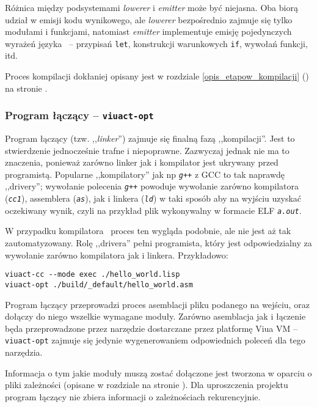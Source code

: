Różnica między podsystemami \emph{lowerer} i \emph{emitter} może być niejasna. Oba biorą udział w emisji
kodu wynikowego, ale \emph{lowerer} bezpośrednio zajmuje się tylko modułami i funkcjami, natomiast
\emph{emitter} implementuje emisję pojedynczych wyrażeń języka \ViuAct\ -- przypisań \texttt{let}, konstrukcji
warunkowych \texttt{if}, wywołań funkcji, itd.

Proces kompilacji dokłaniej opisany jest w rozdziale \ref{opis_etapow_kompilacji}
() na stronie \pageref{opis_etapow_kompilacji}.

\subsubsection{Program łączący -- \texttt{viuact-opt}}
\label{opis_linkera}

Program łączący (tzw. ,,\emph{linker}'') zajmuje się finalną fazą ,,kompilacji''.
Jest to stwierdzenie jednocześnie trafne i niepoprawne. Zazwyczaj jednak nie ma to znaczenia, ponieważ zarówno
linker jak i kompilator jest ukrywany przed programistą. Popularne ,,kompilatory'' jak np \emph{\texttt{g++}}
z GCC to tak naprawdę ,,drivery''; wywołanie polecenia \emph{\texttt{g++}} powoduje wywołanie zarówno
kompilatora (\emph{\texttt{cc1}}), assemblera (\emph{\texttt{as}}), jak i linkera (\emph{\texttt{ld}}) w taki
sposób aby na wyjściu uzyskać oczekiwany wynik, czyli na przykład plik wykonywalny w formacie
ELF \emph{\texttt{a.out}}.

W przypadku kompilatora \ViuAct\ proces ten wygląda podobnie, ale nie jest aż tak zautomatyzowany.
Rolę ,,drivera'' pełni programista, który jest odpowiedzialny za wywołanie zarówno kompilatora jak i linkera.
Przykładowo:

\begin{lstlisting}[caption={,,Hello World!'' kompilacji}]
viuact-cc --mode exec ./hello_world.lisp
viuact-opt ./build/_default/hello_world.asm
\end{lstlisting}

Program łączący przeprowadzi proces asemblacji pliku podanego na wejściu, oraz dołączy do niego wszelkie
wymagane moduły. Zarówno asemblacja jak i łączenie będa przeprowadzone przez narzędzie dostarczane przez
platformę Viua VM -- \texttt{viuact-opt} zajmuje się jedynie wygenerowaniem odpowiednich poleceń dla tego
narzędzia.

Informacja o tym jakie moduły muszą zostać dołączone jest tworzona w oparciu o pliki zależności (opisane w
rozdziale  na stronie \pageref{pliki_zaleznosci_modulow}).
Dla uproszczenia projektu program łączący nie zbiera informacji o zależnościach rekurencyjnie.

